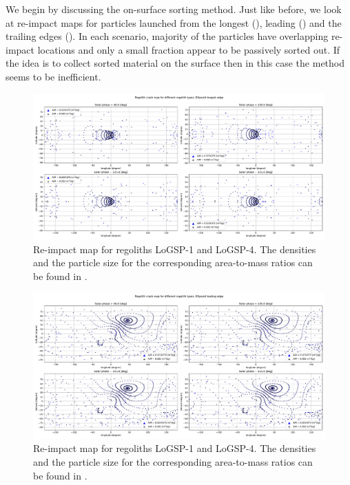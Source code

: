 %
\newline\newline
%
We begin by discussing the on-surface sorting method. Just like before, we look at re-impact maps for particles launched from the longest (), leading () and the trailing edges (). In each scenario, majority of the particles have overlapping re-impact locations and only a small fraction appear to be passively sorted out. If the idea is to collect sorted material on the surface then in this case the method seems to be inefficient.
\begin{figure}[htb]
\centering
\captionsetup{justification=centering}
\includegraphics[angle=90, width=\textwidth, height=\textheight, keepaspectratio=true]{asteroid_mining/longestEdge_crashMap.pdf}
\caption{Re-impact map for regoliths LoGSP-1 and LoGSP-4. The densities and the particle size for the corresponding area-to-mass ratios can be found in .}
\label{fig:longestEdge_crashmap_sorting}
\end{figure}
\FloatBarrier
\begin{figure}[htb]
\centering
\captionsetup{justification=centering}
\includegraphics[angle=90, width=\textwidth, height=\textheight, keepaspectratio=true]{asteroid_mining/leadingEdge_crashMap.pdf}
\caption{Re-impact map for regoliths LoGSP-1 and LoGSP-4. The densities and the particle size for the corresponding area-to-mass ratios can be found in .}
\label{fig:leadingEdge_crashmap_sorting}
\end{figure}
